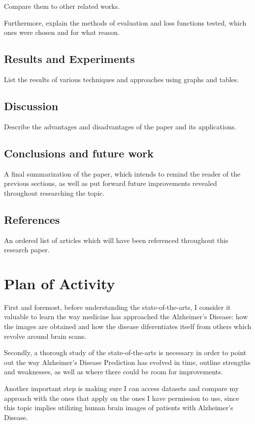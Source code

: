 \documentclass[a4paper]{article} %
\begin{document}
Compare them to other related works.

Furthermore, explain the methods of evaluation and loss functions tested, which ones were chosen and for what reason.

\subsection{Results and Experiments}
List the results of various techniques and approaches using graphs and tables.

\subsection{Discussion}
Describe the advantages and disadvantages of the paper and its applications.

\subsection{Conclusions and future work}
A final summarization of the paper, which intends to remind the reader of the previous sections,
as well as put forward future improvements revealed throughout researching the topic.

\subsection{References}
An ordered list of articles which will have been referenced throughout this research paper.

\section{Plan of Activity}
First and foremost, before understanding the state-of-the-arts, I consider it valuable to learn the way medicine has approached
the Alzheimer's Disease: how the images are obtained and how the disease diferentiates itself from others which revolve around
brain scans.

Secondly, a thorough study of the state-of-the-arts is necessary in order to point out the way Alzheimer's Disease Prediction
has evolved in time, outline strengths and weaknesses, as well as where there could be room for improvements.

Another important step is making sure I can access datasets and compare my approach with the ones that apply on the ones I
have permission to use, since this topic implies utilizing human brain images of patients with Alzheimer's Disease.
\end{document}
